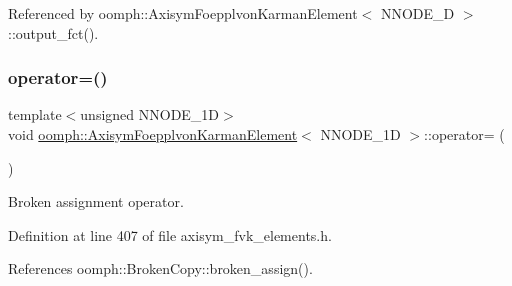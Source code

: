 Referenced by oomph\+::\+Axisym\+Foepplvon\+Karman\+Element$<$ N\+N\+O\+D\+E\+\_\+D $>$\+::output\+\_\+fct().

\mbox{\label{classoomph_1_1AxisymFoepplvonKarmanElement_a2fc69c8a64430a00d344eb55562ab8f2}} 
\subsubsection{\texorpdfstring{operator=()}{operator=()}\hspace{0.1cm}{\footnotesize\ttfamily [1/2]}}
{\footnotesize\ttfamily template$<$unsigned N\+N\+O\+D\+E\+\_\+1D$>$ \\
void \hyperlink{classoomph_1_1AxisymFoepplvonKarmanElement}{oomph\+::\+Axisym\+Foepplvon\+Karman\+Element}$<$ N\+N\+O\+D\+E\+\_\+1D $>$\+::operator= (\begin{DoxyParamCaption}\item[{const \hyperlink{classoomph_1_1AxisymFoepplvonKarmanElement}{Axisym\+Foepplvon\+Karman\+Element}$<$ N\+N\+O\+D\+E\+\_\+1D $>$ \&}]{ }\end{DoxyParamCaption})\hspace{0.3cm}{\ttfamily [inline]}}



Broken assignment operator. 



Definition at line 407 of file axisym\+\_\+fvk\+\_\+elements.\+h.



References oomph\+::\+Broken\+Copy\+::broken\+\_\+assign().

\mbox{\label{classoomph_1_1AxisymFoepplvonKarmanElement_a2fc69c8a64430a00d344eb55562ab8f2}} 
